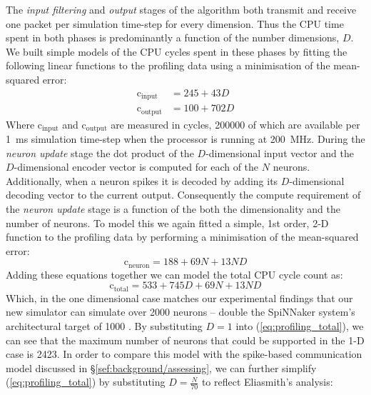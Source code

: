 \documentclass[conference]{IEEEtran}
\begin{document}
The \textit{input filtering} and \textit{output} stages of the algorithm both transmit and receive one packet per simulation time-step for every dimension.
Thus the CPU time spent in both phases is predominantly a function of the number dimensions, $D$.
We built simple models of the CPU cycles spent in these phases by fitting the following linear functions to the profiling data using a minimisation of the mean-squared error:
%
\begin{align}
  \mathrm{c}_\mathrm{input} & = 245 + 43 D \label{eq:profiling_input}\\
  \mathrm{c}_\mathrm{output} & = 100 + 702 D \label{eq:profiling_output}
\end{align}
%
Where $\mathrm{c}_\mathrm{input}$ and $\mathrm{c}_\mathrm{output}$ are measured in cycles, \num{200000} of which are available per \SI{1}{\milli\second} simulation time-step when the processor is running at \SI{200}{\mega\hertz}.
During the \textit{neuron update} stage the dot product of the $D$-dimensional input vector and the $D$-dimensional encoder vector is computed for each of the $N$ neurons.
Additionally, when a neuron spikes it is decoded by adding its $D$-dimensional decoding vector to the current output.
Consequently the compute requirement of the \textit{neuron update} stage is a function of the both the dimensionality and the number of neurons.
To model this we again fitted a simple, 1st order, 2-D function to the profiling data by performing a minimisation of the mean-squared error:
%
\begin{equation}
  \mathrm{c}_\mathrm{neuron} = 188 + 69 N + 13 N D\label{eq:profiling_neuron}
\end{equation}
%
Adding these equations together we can model the total CPU cycle count as:
%
\begin{equation}
  \mathrm{c}_\mathrm{total} = 533 + 745 D + 69 N + 13 N D\label{eq:profiling_total}
\end{equation}
%
Which, in the one dimensional case matches our experimental findings that our new simulator can simulate over 2000 neurons -- double the SpiNNaker system's architectural target of 1000 \parencite{}. 
By substituting $D=1$ into (\ref{eq:profiling_total}), we can see that the maximum number of neurons that could be supported in the 1-D case is 2423.
In order to compare this model with the spike-based communication model discussed in \S\ref{sef:background/assessing}, we can further simplify (\ref{eq:profiling_total}) by substituting $D=\frac{N}{70}$ to reflect Eliasmith's \parencite{eliasmith2013build} analysis:
\end{document}
